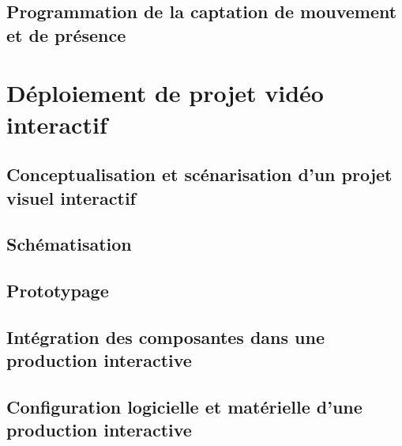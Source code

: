 \documentclass[
]{book}
\begin{document}
\hypertarget{programmation-de-la-captation-de-mouvement-et-de-pruxe9sence}{%
\section{Programmation de la captation de mouvement et de présence}\label{programmation-de-la-captation-de-mouvement-et-de-pruxe9sence}}

\hypertarget{duxe9ploiement-de-projet-viduxe9o-interactif}{%
\chapter{Déploiement de projet vidéo interactif}\label{duxe9ploiement-de-projet-viduxe9o-interactif}}

\hypertarget{conceptualisation-et-scuxe9narisation-dun-projet-visuel-interactif}{%
\section{Conceptualisation et scénarisation d'un projet visuel interactif}\label{conceptualisation-et-scuxe9narisation-dun-projet-visuel-interactif}}

\hypertarget{schuxe9matisation}{%
\section{Schématisation}\label{schuxe9matisation}}

\hypertarget{prototypage}{%
\section{Prototypage}\label{prototypage}}

\hypertarget{intuxe9gration-des-composantes-dans-une-production-interactive}{%
\section{Intégration des composantes dans une production interactive}\label{intuxe9gration-des-composantes-dans-une-production-interactive}}

\hypertarget{configuration-logicielle-et-matuxe9rielle-dune-production-interactive}{%
\section{Configuration logicielle et matérielle d'une production interactive}\label{configuration-logicielle-et-matuxe9rielle-dune-production-interactive}}
\end{document}
